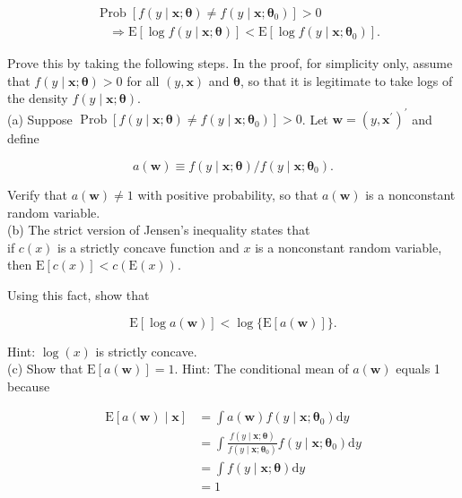\documentclass[10pt]{article}
\begin{document}
$$
\begin{aligned}
& \operatorname{Prob}\left[f(y \mid \mathbf{x} ; \boldsymbol{\theta}) \neq f\left(y \mid \mathbf{x} ; \boldsymbol{\theta}_{0}\right)\right]>0 \\
& \quad \Rightarrow \mathrm{E}[\log f(y \mid \mathbf{x} ; \boldsymbol{\theta})]<\mathrm{E}\left[\log f\left(y \mid \mathbf{x} ; \boldsymbol{\theta}_{0}\right)\right] .
\end{aligned}
$$

Prove this by taking the following steps. In the proof, for simplicity only, assume that $f(y \mid \mathbf{x} ; \boldsymbol{\theta})>0$ for all $(y, \mathbf{x})$ and $\boldsymbol{\theta}$, so that it is legitimate to take logs of the density $f(y \mid \mathbf{x} ; \boldsymbol{\theta})$.\\
(a) Suppose $\operatorname{Prob}\left[f(y \mid \mathbf{x} ; \boldsymbol{\theta}) \neq f\left(y \mid \mathbf{x} ; \boldsymbol{\theta}_{0}\right)\right]>0$. Let $\mathbf{w}=\left(y, \mathbf{x}^{\prime}\right)^{\prime}$ and define

$$
a(\mathbf{w}) \equiv f(y \mid \mathbf{x} ; \boldsymbol{\theta}) / f\left(y \mid \mathbf{x} ; \boldsymbol{\theta}_{0}\right) .
$$

Verify that $a(\mathbf{w}) \neq 1$ with positive probability, so that $a(\mathbf{w})$ is a nonconstant random variable.\\
(b) The strict version of Jensen's inequality states that\\
if $c(x)$ is a strictly concave function and $x$ is a nonconstant random variable, then $\mathrm{E}[c(x)]<c(\mathrm{E}(x))$.

Using this fact, show that

$$
\mathrm{E}[\log a(\mathbf{w})]<\log \{\mathrm{E}[a(\mathbf{w})]\} .
$$

Hint: $\log (x)$ is strictly concave.\\
(c) Show that $\mathrm{E}[a(\mathbf{w})]=1$. Hint: The conditional mean of $a(\mathbf{w})$ equals 1 because

$$
\begin{aligned}
\mathrm{E}[a(\mathbf{w}) \mid \mathbf{x}] & =\int a(\mathbf{w}) f\left(y \mid \mathbf{x} ; \boldsymbol{\theta}_{0}\right) \mathrm{d} y \\
& =\int \frac{f(y \mid \mathbf{x} ; \boldsymbol{\theta})}{f\left(y \mid \mathbf{x} ; \boldsymbol{\theta}_{0}\right)} f\left(y \mid \mathbf{x} ; \boldsymbol{\theta}_{0}\right) \mathrm{d} y \\
& =\int f(y \mid \mathbf{x} ; \boldsymbol{\theta}) \mathrm{d} y \\
& =1
\end{aligned}
$$
\end{document}
